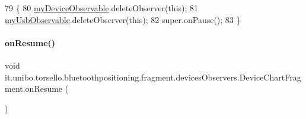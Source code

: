 \begin{DoxyCode}
79                           \{
80         \hyperlink{classit_1_1unibo_1_1torsello_1_1bluetoothpositioning_1_1fragment_1_1devicesObservers_1_1DeviceChartFragment_a2c8de6418fffdb5affe4de22185b55eb_a2c8de6418fffdb5affe4de22185b55eb}{myDeviceObservable}.deleteObserver(\textcolor{keyword}{this});
81         \hyperlink{classit_1_1unibo_1_1torsello_1_1bluetoothpositioning_1_1fragment_1_1devicesObservers_1_1DeviceChartFragment_a577dad67b3eabc0f48e95d08e9f5881b_a577dad67b3eabc0f48e95d08e9f5881b}{myUsbObservable}.deleteObserver(\textcolor{keyword}{this});
82         super.onPause();
83     \}
\end{DoxyCode}
\hypertarget{classit_1_1unibo_1_1torsello_1_1bluetoothpositioning_1_1fragment_1_1devicesObservers_1_1DeviceChartFragment_ae76428fde174d312bed28057f3f66d46_ae76428fde174d312bed28057f3f66d46}{}\label{classit_1_1unibo_1_1torsello_1_1bluetoothpositioning_1_1fragment_1_1devicesObservers_1_1DeviceChartFragment_ae76428fde174d312bed28057f3f66d46_ae76428fde174d312bed28057f3f66d46} 
\paragraph{\texorpdfstring{on\+Resume()}{onResume()}}
{\footnotesize\ttfamily void it.\+unibo.\+torsello.\+bluetoothpositioning.\+fragment.\+devices\+Observers.\+Device\+Chart\+Fragment.\+on\+Resume (\begin{DoxyParamCaption}{ }\end{DoxyParamCaption})}


